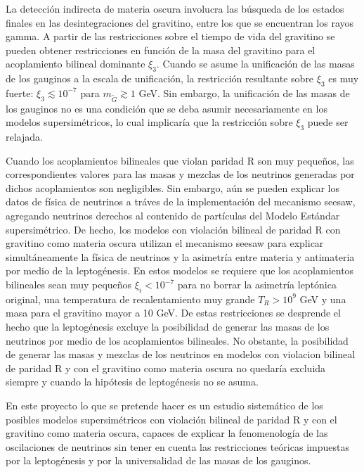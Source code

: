La detección indirecta de materia oscura involucra las búsqueda de los estados finales en las desintegraciones del gravitino, entre los que se encuentran los rayos gamma. A partir de las restricciones sobre el tiempo de vida del gravitino se pueden obtener restricciones en función de la masa del gravitino para el acoplamiento bilineal dominante $\xi_3$. Cuando se asume la unificación de las masas de los gauginos a la escala de unificación, la restricción resultante sobre $\xi_3$ es muy fuerte: $\xi_3\lesssim 10^{-7}$ para $m_{\tilde G}\gtrsim 1$ GeV.  Sin embargo, la unificación de las masas de los gauginos no es una condición que se deba asumir necesariamente en los modelos supersimétricos, lo cual implicaría que la restricción sobre $\xi_3$ puede ser relajada.

Cuando los acoplamientos bilineales que violan paridad R son muy pequeños, las correspondientes valores para las masas y mezclas de los neutrinos generadas por dichos acoplamientos son negligibles. Sin embargo, aún se pueden explicar los datos de física de neutrinos a tráves de la implementación del mecanismo seesaw, agregando neutrinos derechos al contenido de partículas del Modelo Estándar supersimétrico. De hecho, los modelos con violación bilineal de paridad R con gravitino como materia oscura utilizan el mecanismo seesaw para explicar simultáneamente la física de neutrinos y la asimetría entre materia y antimateria por medio de la leptogénesis. En estos modelos se requiere que los acoplamientos bilineales sean muy pequeños $\xi_i<10^{-7}$ para no borrar la asimetría leptónica original, una temperatura de recalentamiento muy grande $T_R>10^9$ GeV y una masa para el gravitino mayor a 10 GeV. De estas restricciones se desprende el hecho que la leptogénesis excluye la posibilidad de generar las masas de los neutrinos por medio de los acoplamientos bilineales. No obstante, la posibilidad de generar las masas y mezclas de los neutrinos en modelos con violacion bilineal de paridad R y con el gravitino como materia oscura no quedaría excluida siempre y cuando la hipótesis de leptogénesis no se asuma.

En este proyecto lo que se pretende hacer es un estudio sistemático de los posibles modelos supersimétricos con violación bilineal de paridad R y con el gravitino como materia oscura, capaces de explicar la fenomenología de las oscilaciones de neutrinos sin tener en cuenta las restricciones teóricas impuestas por la leptogénesis  y por la universalidad de las masas de los gauginos. 


